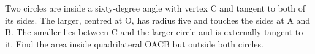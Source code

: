 Two circles are inside a sixty-degree angle with vertex C and tangent to both of its sides. The larger, centred at O, has radius five and touches the sides at A and B. The smaller lies between C and the larger circle and is externally tangent to it. Find the area inside quadrilateral OACB but outside both circles.
